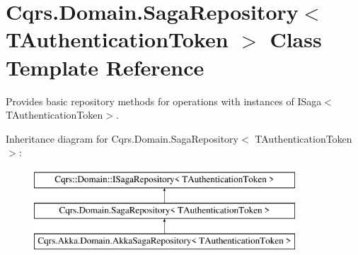 \hypertarget{classCqrs_1_1Domain_1_1SagaRepository}{}\section{Cqrs.\+Domain.\+Saga\+Repository$<$ T\+Authentication\+Token $>$ Class Template Reference}
\label{classCqrs_1_1Domain_1_1SagaRepository}


Provides basic repository methods for operations with instances of I\+Saga$<$\+T\+Authentication\+Token$>$.  


Inheritance diagram for Cqrs.\+Domain.\+Saga\+Repository$<$ T\+Authentication\+Token $>$\+:\begin{figure}[H]
\begin{center}
\leavevmode
\includegraphics[height=3.000000cm]{classCqrs_1_1Domain_1_1SagaRepository}
\end{center}
\end{figure}
